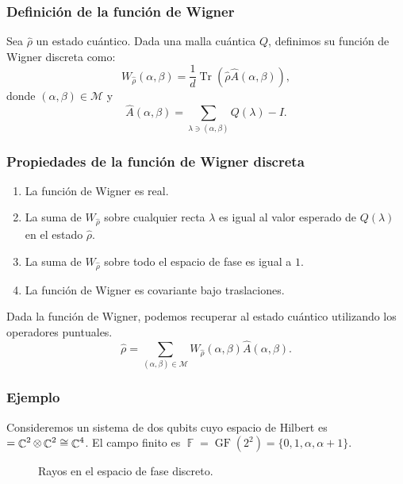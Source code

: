 \documentclass[10pt,spanish]{beamer}
\DeclareMathOperator{\C}{\mathbb{C}}
\DeclareMathOperator{\F}{\mathbb{F}}
\let\H\relax
\DeclareMathOperator{\H}{\mathcal H}
\DeclareMathOperator{\Tr}{Tr}
\DeclareMathOperator{\GF}{GF}
\begin{document}
  \begin{frame}
    \frametitle{Definición de la función de Wigner}

    \begin{definition}
      Sea $\hat\rho$ un estado cuántico. Dada una malla
      cuántica $Q$, definimos su función de Wigner
      discreta como:
      \begin{equation}
        W_{\hat\rho}(\alpha,\beta)
        = \frac{1}{d} \Tr\left(
          \hat\rho \hat A(\alpha,\beta)
        \right),
      \end{equation}
      donde $(\alpha,\beta) \in \mathcal M$ y 
      \begin{equation}
        \hat A(\alpha,\beta)
        = \sum_{\lambda \ni (\alpha,\beta)}^{}
        Q(\lambda) - I.
      \end{equation}
    \end{definition}
  \end{frame}

  \begin{frame}
    \frametitle{Propiedades de la función de Wigner
    discreta}

    \begin{enumerate}
      \item La función de Wigner es real.
      \item La suma de $W_{\hat\rho}$ sobre cualquier recta
        $\lambda$ es igual al valor esperado de $Q(\lambda)$
        en el estado $\hat\rho$.
      \item La suma de $W_{\hat\rho}$ sobre todo el espacio
        de fase es igual a $1$.
      \item La función de Wigner es covariante bajo
        traslaciones.
    \end{enumerate}

    \vspace{10pt}

    Dada la función de Wigner, podemos recuperar al estado
    cuántico utilizando los operadores puntuales.
    \begin{equation}
      \hat\rho
      = \sum_{(\alpha,\beta) \in \mathcal M}^{}
      W_{\hat\rho}(\alpha,\beta) \hat A(\alpha,\beta).
    \end{equation}
  \end{frame}

  \begin{frame}
    \frametitle{Ejemplo}

    Consideremos un sistema de dos qubits cuyo espacio de
    Hilbert es $\H = \C^2 \otimes \C^2 \cong \C^{4}$. El
    campo finito es $\F = \GF(2^2) =
    \{0,1,\alpha,\alpha+1\}$.
    \begin{figure}[h]
      \centering
      \scalebox{0.4}{
        
      }
      \caption{Rayos en el espacio de fase discreto.}
      \label{fig:affine-desargues-2-2}
    \end{figure}
  \end{frame}
\end{document}
